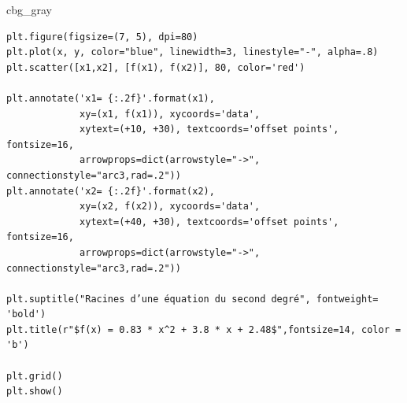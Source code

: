 \documentclass[%
oneside,                 %
final,                   %
10pt,french]{article}
\newenvironment{_cod_tight}[1]{
   \def\FrameCommand{\colorbox{#1}}
   \FrameRule0.6pt\MakeFramed {\FrameRestore}\vskip3mm}
   {\vskip0mm\endMakeFramed}
\newenvironment{cod}[1]{
\bgroup\rmfamily
\fboxsep=0mm\relax
\begin{_cod_tight}{#1}
\list{}{\parsep=-2mm\parskip=0mm\topsep=0pt\leftmargin=2mm
\rightmargin=2\leftmargin\leftmargin=4pt\relax}
\item\relax}
{\endlist\end{_cod_tight}\egroup}
\newenvironment{doconceexercise}{}{}
\begin{document}
\begin{doconceexercise}
\begin{cod}{cbg_gray}
\begin{verbatim}
plt.figure(figsize=(7, 5), dpi=80)
plt.plot(x, y, color="blue", linewidth=3, linestyle="-", alpha=.8)
plt.scatter([x1,x2], [f(x1), f(x2)], 80, color='red')

plt.annotate('x1= {:.2f}'.format(x1),
             xy=(x1, f(x1)), xycoords='data',
             xytext=(+10, +30), textcoords='offset points', fontsize=16,
             arrowprops=dict(arrowstyle="->", connectionstyle="arc3,rad=.2"))
plt.annotate('x2= {:.2f}'.format(x2),
             xy=(x2, f(x2)), xycoords='data',
             xytext=(+40, +30), textcoords='offset points', fontsize=16,
             arrowprops=dict(arrowstyle="->", connectionstyle="arc3,rad=.2"))

plt.suptitle("Racines d’une équation du second degré", fontweight= 'bold')
plt.title(r"$f(x) = 0.83 * x^2 + 3.8 * x + 2.48$",fontsize=14, color = 'b')

plt.grid()
plt.show()
\end{verbatim}
\end{cod}
\noindent


\end{doconceexercise}


\end{document}
